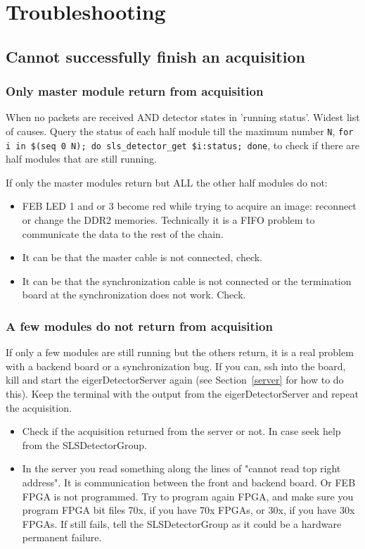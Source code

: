 \documentclass{article}
\begin{document}
{{{\section{Troubleshooting}
\subsection{Cannot successfully finish an acquisition}
\subsubsection{Only master module return from acquisition}
When no packets are received AND detector states in 'running status'. Widest list of causes. 
Query the status of each half module till the maximum number {\tt{N}},  {\tt{for i in \$(seq\ 0\ N); do sls\_detector\_get \$i:status; done}}, to check if there are half modules that are still running.

If only the master modules return but ALL the other half modules do not: 
\begin{itemize}
\item FEB LED 1 and or 3 become red while trying to acquire an image: reconnect or change the DDR2 memories. Technically it is a FIFO problem to communicate the data to the rest of the chain. 
\item It can be that the master cable is not connected, check.
\item It can be that the synchronization cable is not connected or the termination board at the synchronization does not work. Check.
\end{itemize}

\subsubsection{A few modules do not return from acquisition}
If only a few modules are still running but the others return, it is a real problem with a backend board or a synchronization bug.
If you can, ssh into the board, kill and start the eigerDetectorServer again (see Section~\ref{server} for how to do this). Keep the terminal with the output from the  eigerDetectorServer and repeat the acquisition. 
\begin{itemize}
\item Check if the acquisition returned from the server or not. In case seek help from the SLSDetectorGroup.
\item In the server you read something along the lines of "cannot read top right address". It is communication between the front and backend board. Or FEB FPGA is not programmed. Try to program again FPGA, and make sure you program FPGA bit files 70x, if you have 70x FPGAs, or 30x, if you have 30x FPGAs. If still fails, tell the SLSDetectorGroup as it could be a hardware permanent failure.
\end{itemize}

}}}
\end{document}
